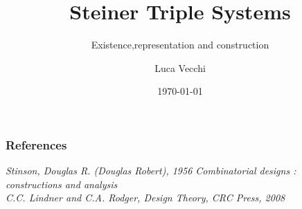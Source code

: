 \documentclass{beamer}
\title{Steiner Triple Systems}
\subtitle{Existence,representation and construction}
\author{Luca Vecchi}
\institute{University of Milan}
\date{\today}
\begin{document}
	\begin{frame}
	\titlepage
	\end{frame}
	
	
	
	
	
	
	
	
	
	


	\begin{frame}
	\frametitle{References}
	
	\textit{Stinson, Douglas R. (Douglas Robert), 1956 	Combinatorial designs : constructions and analysis}\\
	\textit{C.C. Lindner and C.A. Rodger, Design Theory, CRC Press, 2008}
	\end{frame}
\end{document}
